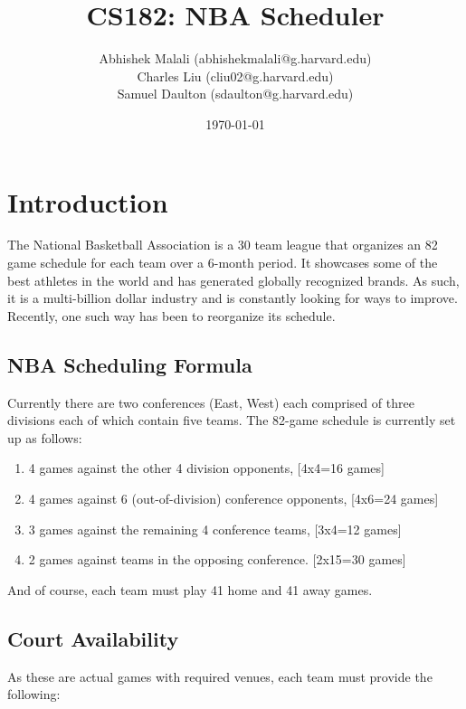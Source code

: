 \documentclass{article}
\begin{document}
	\title{CS182: NBA Scheduler}
	\author{Abhishek Malali (abhishekmalali@g.harvard.edu)\\
			Charles Liu (cliu02@g.harvard.edu)\\
			Samuel Daulton (sdaulton@g.harvard.edu)}
	\date{\today}
	\maketitle

	\section{Introduction}

	The National Basketball Association is a 30 team league that organizes an 82 game schedule for each team over a 6-month period. It showcases some of the best athletes in the world and has generated globally recognized brands. As such, it is a multi-billion dollar industry and is constantly looking for ways to improve. Recently, one such way has been to reorganize its schedule.

	\subsection{NBA Scheduling Formula}

	Currently there are two conferences (East, West) each comprised of three divisions each of which contain five teams. The 82-game schedule is currently set up as follows:

	\begin{enumerate}
		\item 4 games against the other 4 division opponents, [4x4=16 games]
		\item 4 games against 6 (out-of-division) conference opponents, [4x6=24 games]
		\item 3 games against the remaining 4 conference teams, [3x4=12 games]
		\item 2 games against teams in the opposing conference. [2x15=30 games]
	\end{enumerate}

	And of course, each team must play 41 home and 41 away games.

	\subsection{Court Availability}

	As these are actual games with required venues, each team must provide the following:
\end{document}
